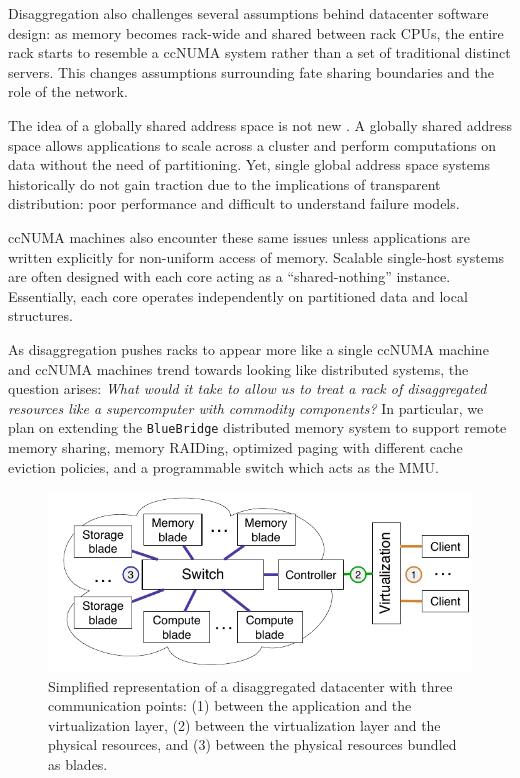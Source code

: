 Disaggregation also challenges several assumptions behind datacenter software
design: as memory becomes rack-wide and shared between rack CPUs, the entire
rack starts to resemble a ccNUMA system rather than a set of traditional
distinct servers. This changes assumptions surrounding fate sharing boundaries
and the role of the network.

The idea of a globally shared address space is not new . A
globally shared address space allows applications to scale across a cluster and
perform computations on data without the need of partitioning. Yet, single
global address space systems historically do not gain traction due to the
implications of transparent distribution: poor performance and difficult to
understand failure models.

ccNUMA machines also encounter these same issues unless applications are
written explicitly for non-uniform access of memory. Scalable
single-host systems are often designed with each core acting as a
``shared-nothing'' instance. Essentially, each core operates independently on
partitioned data and local structures. 

As disaggregation pushes racks to appear more like a single ccNUMA machine and
ccNUMA machines trend towards looking like distributed systems,
the question arises: \emph{What would it take to allow us to treat a rack of
disaggregated resources like a supercomputer with commodity components?} In
particular, we plan on extending the \texttt{BlueBridge} distributed memory
system to support remote memory sharing, memory RAIDing, optimized paging with
different cache eviction policies, and a programmable switch which acts as the
MMU.


\begin{figure}
    \centering
    \includegraphics[width=\columnwidth]{fig/ddc-overview}
    \caption{Simplified representation of a disaggregated datacenter with
    three communication points: (1) between the application and the
    virtualization layer,
    (2) between the virtualization layer and the physical resources, and (3)
    between the physical resources bundled as blades.}
    \label{fig:DDC}
\end{figure}
